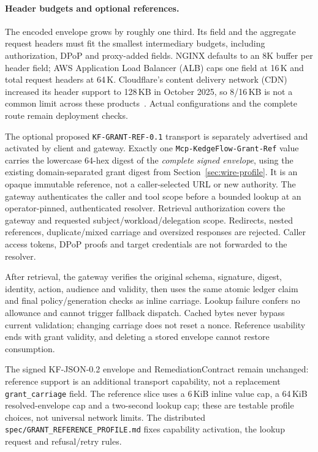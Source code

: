 \paragraph{Header budgets and optional references.}
The encoded envelope grows by roughly one third. Its field and the aggregate request headers must fit the smallest intermediary budgets, including authorization, DPoP and proxy-added fields. NGINX defaults to an 8K buffer per header field; AWS Application Load Balancer (ALB) caps one field at 16\,K and total request headers at 64\,K. Cloudflare's content delivery network (CDN) increased its header support to 128\,KB in October 2025, so 8/16\,KB is not a common limit across these products~\cite{nginxheaders2026,awsalbheaders2026,cloudflareheaders2025}. Actual configurations and the complete route remain deployment checks.

The optional proposed \texttt{KF-GRANT-REF-0.1} transport is separately advertised and activated by client and gateway. Exactly one \texttt{Mcp-KedgeFlow-Grant-Ref} value carries the lowercase 64-hex digest of the \emph{complete signed envelope}, using the existing domain-separated grant digest from Section~\ref{sec:wire-profile}. It is an opaque immutable reference, not a caller-selected URL or new authority. The gateway authenticates the caller and tool scope before a bounded lookup at an operator-pinned, authenticated resolver. Retrieval authorization covers the gateway and requested subject/workload/delegation scope. Redirects, nested references, duplicate/mixed carriage and oversized responses are rejected. Caller access tokens, DPoP proofs and target credentials are not forwarded to the resolver.

After retrieval, the gateway verifies the original schema, signature, digest, identity, action, audience and validity, then uses the same atomic ledger claim and final policy/generation checks as inline carriage. Lookup failure confers no allowance and cannot trigger fallback dispatch. Cached bytes never bypass current validation; changing carriage does not reset a nonce. Reference usability ends with grant validity, and deleting a stored envelope cannot restore consumption.

The signed KF-JSON-0.2 envelope and RemediationContract remain unchanged: reference support is an additional transport capability, not a replacement \texttt{grant\_carriage} field. The reference slice uses a 6\,KiB inline value cap, a 64\,KiB resolved-envelope cap and a two-second lookup cap; these are testable profile choices, not universal network limits. The distributed \nolinkurl{spec/GRANT_REFERENCE_PROFILE.md} fixes capability activation, the lookup request and refusal/retry rules.

